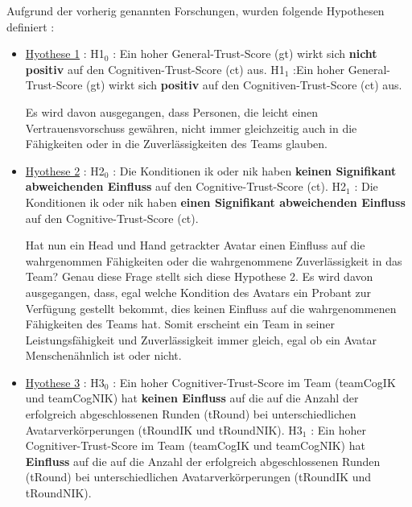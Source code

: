 \documentclass[a4paper,11pt]{article}%
\renewcommand{\\}{\vspace*{0.5\baselineskip} \newline}
\begin{document}
Aufgrund der vorherig genannten Forschungen, wurden folgende Hypothesen definiert :
\begin{itemize}
	\item{\underline{Hyothese 1} :\\ 
	H1$_{0}$ : Ein hoher General-Trust-Score (\ac{gt}) wirkt sich \textbf{nicht positiv} auf den Cognitiven-Trust-Score (\ac{ct}) aus. \\
	H1$_{1}$ :Ein hoher General-Trust-Score (\ac{gt}) wirkt sich \textbf{positiv} auf den Cognitiven-Trust-Score (\ac{ct}) aus.}
	
Es wird davon ausgegangen, dass Personen, die leicht einen Vertrauensvorschuss gewähren, nicht immer gleichzeitig auch in die Fähigkeiten oder in die Zuverlässigkeiten des Teams glauben.

\item{\underline{Hyothese 2} :\\ 
	H2$_{0}$ : Die Konditionen \ac{ik} oder \ac{nik} haben \textbf{keinen Signifikant abweichenden Einfluss} auf den Cognitive-Trust-Score (\ac{ct}). \\
	H2$_{1}$ : Die Konditionen \ac{ik} oder \ac{nik} haben \textbf{einen Signifikant abweichenden Einfluss} auf den Cognitive-Trust-Score (\ac{ct}).}

	
Hat nun ein Head und Hand getrackter Avatar einen Einfluss auf die wahrgenommen Fähigkeiten oder die wahrgenommene Zuverlässigkeit in das Team? Genau diese Frage stellt sich diese Hypothese 2.
Es wird davon ausgegangen, dass, egal welche Kondition des Avatars ein Probant zur Verfügung gestellt bekommt, dies keinen Einfluss auf die wahrgenommenen Fähigkeiten des Teams hat. Somit erscheint ein Team in seiner Leistungsfähigkeit und Zuverlässigkeit immer gleich, egal ob ein Avatar Menschenähnlich ist oder nicht.

	\item{\underline{Hyothese 3} :\\ 
	H3$_{0}$ : Ein hoher Cognitiver-Trust-Score im Team (\ac{teamCogIK} und \ac{teamCogNIK}) hat \textbf{keinen Einfluss} auf die auf die Anzahl der erfolgreich abgeschlossenen Runden (\ac{tRound}) bei unterschiedlichen Avatarverkörperungen (\ac{tRoundIK} und \ac{tRoundNIK}). \\
	H3$_{1}$ : Ein hoher Cognitiver-Trust-Score im Team (\ac{teamCogIK} und \ac{teamCogNIK}) hat \textbf{Einfluss} auf die auf die Anzahl der erfolgreich abgeschlossenen Runden (\ac{tRound}) bei unterschiedlichen Avatarverkörperungen (\ac{tRoundIK} und \ac{tRoundNIK}).}
	

\end{itemize}
\end{document}
